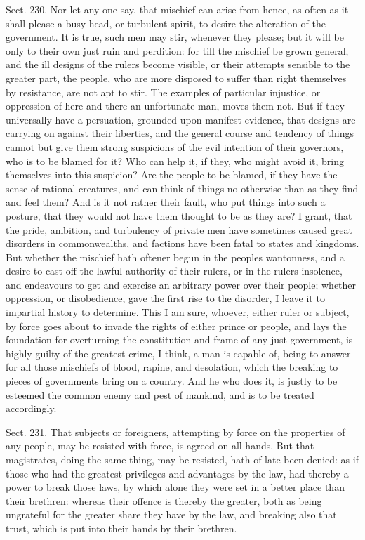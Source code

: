 \documentclass[11pt,openany]{book}
\begin{document}
Sect. 230. Nor let any one say, that mischief can arise from hence, as often as it shall please a busy head, or turbulent spirit, to desire the alteration of the government. It is true, such men may stir, whenever they please; but it will be only to their own just ruin and perdition: for till the mischief be grown general, and the ill designs of the rulers become visible, or their attempts sensible to the greater part, the people, who are more disposed to suffer than right themselves by resistance, are not apt to stir. The examples of particular injustice, or oppression of here and there an unfortunate man, moves them not. But if they universally have a persuation, grounded upon manifest evidence, that designs are carrying on against their liberties, and the general course and tendency of things cannot but give them strong suspicions of the evil intention of their governors, who is to be blamed for it? Who can help it, if they, who might avoid it, bring themselves into this suspicion? Are the people to be blamed, if they have the sense of rational creatures, and can think of things no otherwise than as they find and feel them? And is it not rather their fault, who put things into such a posture, that they would not have them thought to be as they are? I grant, that the pride, ambition, and turbulency of private men have sometimes caused great disorders in commonwealths, and factions have been fatal to states and kingdoms. But whether the mischief hath oftener begun in the peoples wantonness, and a desire to cast off the lawful authority of their rulers, or in the rulers insolence, and endeavours to get and exercise an arbitrary power over their people; whether oppression, or disobedience, gave the first rise to the disorder, I leave it to impartial history to determine. This I am sure, whoever, either ruler or subject, by force goes about to invade the rights of either prince or people, and lays the foundation for overturning the constitution and frame of any just government, is highly guilty of the greatest crime, I think, a man is capable of, being to answer for all those mischiefs of blood, rapine, and desolation, which the breaking to pieces of governments bring on a country. And he who does it, is justly to be esteemed the common enemy and pest of mankind, and is to be treated accordingly.

Sect. 231. That subjects or foreigners, attempting by force on the properties of any people, may be resisted with force, is agreed on all hands. But that magistrates, doing the same thing, may be resisted, hath of late been denied: as if those who had the greatest privileges and advantages by the law, had thereby a power to break those laws, by which alone they were set in a better place than their brethren: whereas their offence is thereby the greater, both as being ungrateful for the greater share they have by the law, and breaking also that trust, which is put into their hands by their brethren.
\end{document}
